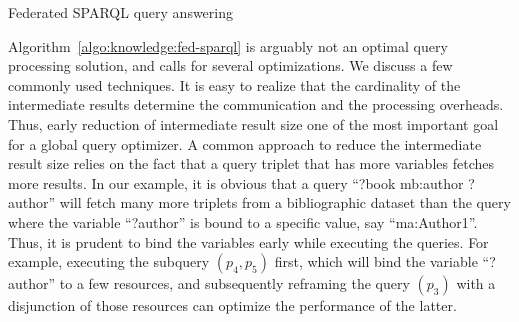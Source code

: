 \begin{algorithm}[!htbp]
        \DontPrintSemicolon
        \SetAlgoLined
        \caption{Federated SPARQL query answering}
        \label{algo:knowledge:fed-sparql}
\end{algorithm}

Algorithm~\ref{algo:knowledge:fed-sparql} is arguably not an optimal query processing solution, and calls for several optimizations.  
We discuss a few commonly used techniques. It is easy to realize that the cardinality of the intermediate results determine the 
communication and the processing overheads. Thus, early reduction of intermediate result size one of the most important goal for 
a global query optimizer. A common approach to reduce the intermediate result size relies on the fact that a query triplet that 
has more variables fetches more results. In our example, 
it is obvious that a query ``?book mb:author ?author'' will fetch many more triplets from a bibliographic dataset than the query 
where the variable ``?author'' is bound to a specific value, say ``ma:Author1''. Thus, it is prudent to bind the variables early 
while executing the queries. For example, executing the subquery $(p_4,p_5)$ first, which will bind the variable ``?author'' to 
a few resources, and subsequently reframing the query $(p_3)$ with a disjunction of those resources can optimize the performance 
of the latter.

